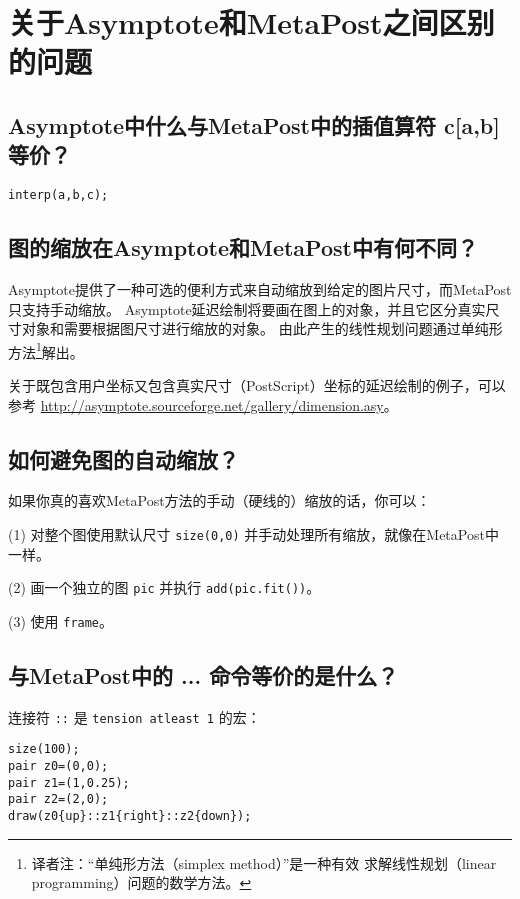 \section{\label{Q8}关于Asymptote和MetaPost之间区别的问题}
\subsection{\label{Q8.1}Asymptote中什么与MetaPost中的插值算符 c[a,b] 等价？}

\begin{lstlisting}
interp(a,b,c);
\end{lstlisting}

\subsection{\label{Q8.2}图的缩放在Asymptote和MetaPost中有何不同？}
Asymptote提供了一种可选的便利方式来自动缩放到给定的图片尺寸，而MetaPost只支持手动缩放。
Asymptote延迟绘制将要画在图上的对象，并且它区分真实尺寸对象和需要根据图尺寸进行缩放的对象。
由此产生的线性规划问题通过单纯形方法\footnote{译者注：“单纯形方法（simplex method）”是一种有效
求解线性规划（linear programming）问题的数学方法。}解出。

关于既包含用户坐标又包含真实尺寸（PostScript）坐标的延迟绘制的例子，可以
参考 \url{http://asymptote.sourceforge.net/gallery/dimension.asy}。

\subsection{\label{Q8.3}如何避免图的自动缩放？}
如果你真的喜欢MetaPost方法的手动（硬线的）缩放的话，你可以：

(1) 对整个图使用默认尺寸 \verb|size(0,0)| 并手动处理所有缩放，就像在MetaPost中一样。

(2) 画一个独立的图 \verb|pic| 并执行 \verb|add(pic.fit())|。

(3) 使用 \verb|frame|。

\subsection{\label{Q8.4}与MetaPost中的 ... 命令等价的是什么？}
连接符 \verb|::| 是 \verb|tension atleast 1| 的宏：

\begin{lstlisting}
size(100);
pair z0=(0,0);
pair z1=(1,0.25);
pair z2=(2,0);
draw(z0{up}::z1{right}::z2{down});
\end{lstlisting}

